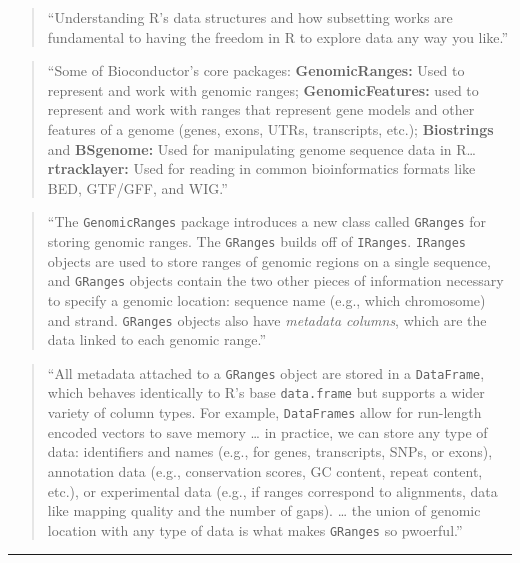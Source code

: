 \documentclass[]{tufte-book}
\begin{document}
\begin{quote}
``Understanding R's data structures and how subsetting works are fundamental to
having the freedom in R to explore data any way you like.'' \citep{buffalo2015bioinformatics}
\end{quote}

\begin{quote}
``Some of Bioconductor's core packages: \textbf{GenomicRanges:} Used to represent and
work with genomic ranges; \textbf{GenomicFeatures:} used to represent and work with ranges
that represent gene models and other features of a genome (genes, exons, UTRs,
transcripts, etc.); \textbf{Biostrings} and \textbf{BSgenome:} Used for manipulating genome
sequence data in R\ldots{} \textbf{rtracklayer:} Used for reading in common bioinformatics formats
like BED, GTF/GFF, and WIG.'' \citep{buffalo2015bioinformatics}
\end{quote}

\begin{quote}
``The \texttt{GenomicRanges} package introduces a new class called \texttt{GRanges} for storing
genomic ranges. The \texttt{GRanges} builds off of \texttt{IRanges}. \texttt{IRanges} objects are used
to store ranges of genomic regions on a single sequence, and \texttt{GRanges} objects contain
the two other pieces of information necessary to specify a genomic location:
sequence name (e.g., which chromosome) and strand. \texttt{GRanges} objects also have
\emph{metadata columns}, which are the data linked to each genomic range.''
\citep{buffalo2015bioinformatics}
\end{quote}

\begin{quote}
``All metadata attached to a \texttt{GRanges} object are stored in a \texttt{DataFrame}, which
behaves identically to R's base \texttt{data.frame} but supports a wider variety of
column types. For example, \texttt{DataFrames} allow for run-length encoded vectors
to save memory \ldots{} in practice, we can store any type of data: identifiers
and names (e.g., for genes, transcripts, SNPs, or exons), annotation data
(e.g., conservation scores, GC content, repeat content, etc.), or experimental
data (e.g., if ranges correspond to alignments, data like mapping quality and the
number of gaps). \ldots{} the union of genomic location with any type of data is what makes
\texttt{GRanges} so pwoerful.'' \citep{buffalo2015bioinformatics}
\end{quote}

\begin{center}\rule{0.5\linewidth}{0.5pt}\end{center}
\end{document}
